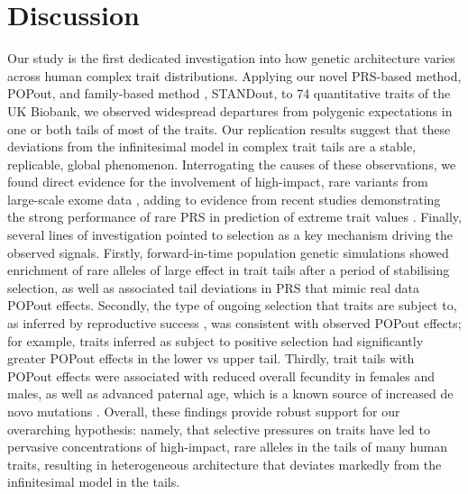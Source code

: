 \documentclass[12pt]{zHenriquesLab-StyleBioRxiv}
\begin{document}
\section*{Discussion} \label{sec:discussion} 
Our study is the first dedicated investigation into how genetic architecture 
varies across human complex trait distributions. Applying our novel 
PRS-based method, POPout, and family-based method \cite{Souaiaia2024}, STANDout, 
to 74 quantitative traits of the UK Biobank, we observed widespread 
departures from polygenic expectations in one or both tails of most of the traits. 
Our replication results suggest that these deviations from the infinitesimal model 
in complex trait tails are a stable, replicable, global phenomenon. Interrogating 
the causes of these observations, we found direct evidence for the involvement of 
high-impact, rare variants from large-scale exome data \cite{Backman2021}, 
adding to evidence from recent studies demonstrating the strong performance 
of rare PRS in prediction of extreme trait values \cite{Fiziev2023}. 
Finally, several lines of investigation pointed to selection 
as a key mechanism driving the observed signals. Firstly, forward-in-time population 
genetic simulations \cite{BC_2019} showed enrichment of rare alleles of large effect in trait tails 
after a period of stabilising selection, as well as associated tail deviations
in PRS that mimic real data POPout effects. Secondly, the type of ongoing selection that 
traits are subject to, as inferred by reproductive success \cite{Sanjak2018}, was consistent with 
observed POPout effects; for example, traits inferred as subject to positive selection 
had significantly greater POPout effects in the lower vs upper tail. Thirdly, trait 
tails with POPout effects were associated with reduced overall fecundity in 
females and males, as well as advanced paternal age, which is a known source of 
increased de novo mutations \cite{Kong2012}. Overall, these findings provide robust support for 
our overarching hypothesis: namely, that selective pressures on traits have led to 
pervasive concentrations of high-impact, rare alleles in the tails of many human traits, 
resulting in heterogeneous architecture that deviates markedly from the infinitesimal model in the tails.
\end{document}
